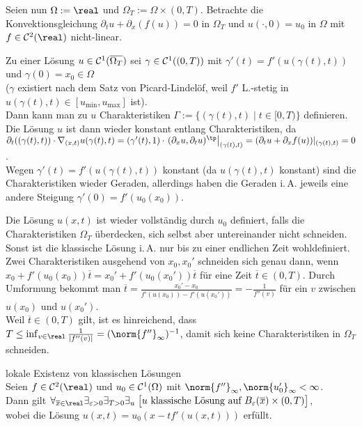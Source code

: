 \begin{Bem}
    Seien nun $\Omega := \real$ und $\Omega_T := \Omega \times (0, T)$.
    Betrachte die Konvektionsgleichung
    $\partial_t u + \partial_x(f(u)) = 0$ in $\Omega_T$ und
    $u(\cdot, 0) = u_0$ in $\Omega$
    mit $f \in \C^2(\real)$ nicht-linear.

    Zu einer Lösung $u \in \mathcal{C}^1(\overline{\Omega_T})$ sei
    $\gamma \in \mathcal{C}^1((0, T))$ mit $\gamma'(t) = f'(u(\gamma(t), t))$ und
    $\gamma(0) = x_0 \in \Omega$\\
    ($\gamma$ existiert nach dem Satz von Picard-Lindelöf, weil $f'$ L.-stetig in
    $u(\gamma(t), t) \in [u_\text{min}, u_\text{max}]$ ist).\\
    Dann kann man zu $u$ Charakteristiken $\Gamma := \{(\gamma(t), t) \;|\; t \in [0, T)\}$
    definieren.\\
    Die Lösung $u$ ist dann wieder konstant entlang Charakteristiken, da\\
    $\partial_t((\gamma(t), t)) \cdot \nabla_{(x,t)} u(\gamma(t), t)
    = (\gamma'(t), 1) \cdot \left.(\partial_x u, \partial_t u)^\tp\right|_{(\gamma(t), t)}
    = (\partial_t u + \partial_x f(u))|_{(\gamma(t), t)} = 0$.\\
    Wegen $\gamma'(t) = f'(u(\gamma(t), t))$ konstant (da $u(\gamma(t), t)$ konstant)
    sind die Charakteristiken wieder Geraden, allerdings
    haben die Geraden i.\,A. jeweils eine andere Steigung $\gamma'(0) = f'(u_0(x_0))$.

    Die Lösung $u(x, t)$ ist wieder vollständig durch $u_0$ definiert, falls die Charakteristiken
    $\Omega_T$ überdecken, sich selbst aber untereinander nicht schneiden.
    Sonst ist die klassische Lösung i.\,A. nur bis zu einer endlichen Zeit wohldefiniert.
    Zwei Charakteristiken ausgehend von $x_0, x_0'$ schneiden sich genau dann, wenn
    $x_0 + f'(u_0(x_0)) \overline{t} = x_0' + f'(u_0(x_0')) \overline{t}$
    für eine Zeit $\overline{t} \in (0, T)$.
    Durch Umformung bekommt man
    $\overline{t} = \frac{x_0' - x_0}{f'(u(x_0)) - f'(u(x_0'))} = -\frac{1}{f''(v)}$
    für ein $v$ zwischen $u(x_0)$ und $u(x_0')$.\\
    Weil $\overline{t} \in (0, T)$ gilt, ist es hinreichend, dass
    $T \le \inf_{v \in \real} \frac{1}{|f''(v)|} = (\norm{f''}_\infty)^{-1}$,
    damit sich keine Charakteristiken in $\Omega_T$ schneiden.
\end{Bem}

\linie

\begin{Satz}{lokale Existenz von klassischen Lösungen}\\
    Seien $f \in \C^2(\real)$ und $u_0 \in \mathcal{C}^1(\Omega)$ mit
    $\norm{f''}_\infty, \norm{u_0'}_\infty < \infty$.\\
    Dann gilt $\forall_{\overline{x} \in \real} \exists_{\varepsilon > 0} \exists_{T > 0}
    \exists_{u}\;
    \big[\text{$u$ klassische Lösung auf $B_\varepsilon(\overline{x}) \times (0, T)$}\big]$,\\
    wobei die Lösung $u(x, t) = u_0(x - tf'(u(x, t)))$ erfüllt.
\end{Satz}

